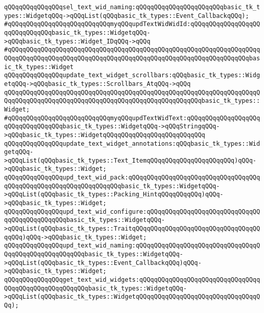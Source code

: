 \verb|qQQqqQQqqQQqqQQqsel_text_wid_naming:qQQqqQQqqQQqqQQqqQQqqQQqbasic_tk_types::WidgetqQQq->qQQqList(qQQqbasic_tk_types::Event_CallbackqQQq);|\newline
\newline
\verb|#qQQqqQQqqQQqqQQqqQQqqQQqqQQqmyqQQqupdTextWidWidId:qQQqqQQqqQQqqQQqqQQqqQQqqQQqqQQqbasic_tk_types::WidgetqQQq->qQQqbasic_tk_types::Widget_IDqQQq->qQQq|\newline
\verb|#qQQqqQQqqQQqqQQqqQQqqQQqqQQqqQQqqQQqqQQqqQQqqQQqqQQqqQQqqQQqqQQqqQQqqQQqqQQqqQQqqQQqqQQqqQQqqQQqqQQqqQQqqQQqqQQqqQQqqQQqqQQqqQQqqQQqqQQqbasic_tk_types::Widget|\newline
\newline
\verb|qQQqqQQqqQQqqQQqupdate_text_widget_scrollbars:qQQqbasic_tk_types::WidgetqQQq->qQQqbasic_tk_types::Scrollbars_AtqQQq->qQQq|\newline
\verb|qQQqqQQqqQQqqQQqqQQqqQQqqQQqqQQqqQQqqQQqqQQqqQQqqQQqqQQqqQQqqQQqqQQqqQQqqQQqqQQqqQQqqQQqqQQqqQQqqQQqqQQqqQQqqQQqqQQqqQQqqQQqbasic_tk_types::Widget;|\newline
\newline
\verb|#qQQqqQQqqQQqqQQqqQQqqQQqqQQqmyqQQqupdTextWidText:qQQqqQQqqQQqqQQqqQQqqQQqqQQqqQQqqQQqbasic_tk_types::WidgetqQQq->qQQqStringqQQq->qQQqbasic_tk_types::WidgetqQQqqQQqqQQqqQQqqQQqqQQqqQQq|\newline
\newline
\verb|qQQqqQQqqQQqqQQqupdate_text_widget_annotations:qQQqbasic_tk_types::WidgetqQQq->qQQqList(qQQqbasic_tk_types::Text_ItemqQQqqQQqqQQqqQQqqQQqqQQq)qQQq->qQQqbasic_tk_types::Widget;|\newline
\verb|qQQqqQQqqQQqqQQqupd_text_wid_pack:qQQqqQQqqQQqqQQqqQQqqQQqqQQqqQQqqQQqqQQqqQQqqQQqqQQqqQQqqQQqqQQqqQQqbasic_tk_types::WidgetqQQq->qQQqList(qQQqbasic_tk_types::Packing_HintqQQqqQQqqQQq)qQQq->qQQqbasic_tk_types::Widget;|\newline
\verb|qQQqqQQqqQQqqQQqupd_text_wid_configure:qQQqqQQqqQQqqQQqqQQqqQQqqQQqqQQqqQQqqQQqqQQqqQQqbasic_tk_types::WidgetqQQq->qQQqList(qQQqbasic_tk_types::TraitqQQqqQQqqQQqqQQqqQQqqQQqqQQqqQQqqQQqqQQq)qQQq->qQQqbasic_tk_types::Widget;|\newline
\verb|qQQqqQQqqQQqqQQqupd_text_wid_naming:qQQqqQQqqQQqqQQqqQQqqQQqqQQqqQQqqQQqqQQqqQQqqQQqqQQqqQQqbasic_tk_types::WidgetqQQq->qQQqList(qQQqbasic_tk_types::Event_CallbackqQQq)qQQq->qQQqbasic_tk_types::Widget;|\newline
\verb|qQQqqQQqqQQqqQQqget_text_wid_widgets:qQQqqQQqqQQqqQQqqQQqqQQqqQQqqQQqqQQqqQQqqQQqqQQqqQQqqQQqbasic_tk_types::WidgetqQQq->qQQqList(qQQqbasic_tk_types::WidgetqQQqqQQqqQQqqQQqqQQqqQQqqQQqqQQqqQQq);|\newline
